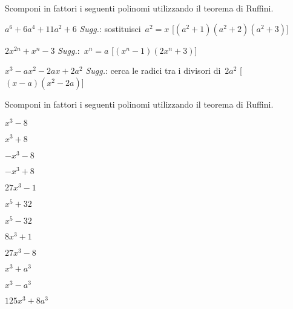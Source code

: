 \begin{esercizio}[\Ast]
\label{ese:17.15}
Scomponi in fattori i seguenti polinomi utilizzando il teorema di Ruffini.
 \begin{enumeratea}
\item \(a^{6}+6a^{4}+11a^{2}+6\)
  \quad \emph{Sugg.}: sostituisci~\(a^{2}=x\)
  \hfill [\((a^{2}+1)(a^{2}+2)(a^{2}+3)\)]
\item \(2x^{2n}+x^{n}-3\)
  \quad \emph{Sugg.}:~\(x^{n}=a\)
  \hfill [\((x^{n}-1)(2x^{n}+3)\)]
\item \(x^{3}-ax^{2}-2ax+2a^{2}\)
  \quad \emph{Sugg.}: cerca le radici tra i divisori di~\(2a^{2}\)
  \hfill [\((x-a)\left(x^{2}-2a\right)\)]
 \end{enumeratea}
\end{esercizio}

\begin{esercizio}
\label{ese:17.11}
Scomponi in fattori i seguenti polinomi utilizzando il teorema di Ruffini.
\begin{multicols}{4}
 \begin{enumeratea}
\item \(x^{3}-8\)
\item \(x^{3}+8\)
\item \(-x^{3}-8\)
\item \(-x^{3}+8\)
\item \(27x^{3}-1\)
\item \(x^{5}+32\)
\item \(x^{5}-32\)
\item \(8x^{3}+1\)
\item \(27x^{3}-8\)
\item \(x^{3}+a^{3}\)
\item \(x^{3}-a^{3}\)
\item \(125x^{3}+8a^{3}\)
 \end{enumeratea}
\end{multicols}
\end{esercizio}

\subsubsection*{}

